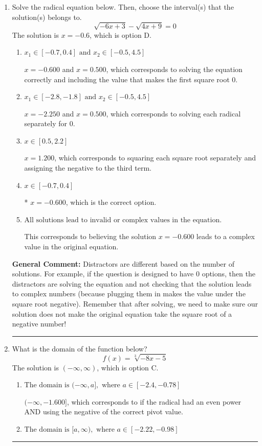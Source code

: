 \documentclass{extbook}[14pt]
\newcommand{\litem}[1]{\item #1

\rule{\textwidth}{0.4pt}}
\begin{document}
\begin{enumerate}\litem{
Solve the radical equation below. Then, choose the interval(s) that the solution(s) belongs to.
\[ \sqrt{-6 x + 3} - \sqrt{4 x + 9} = 0 \]The solution is \( x = -0.6 \), which is option D.\begin{enumerate}[label=\Alph*.]
\item \( x_1 \in [-0.7, 0.4] \text{ and } x_2 \in [-0.5,4.5] \)

$x = -0.600$ and $x = 0.500$, which corresponds to solving the equation correctly and including the value that makes the first square root 0.
\item \( x_1 \in [-2.8, -1.8] \text{ and } x_2 \in [-0.5,4.5] \)

$x = -2.250$ and $x = 0.500$, which corresponds to solving each radical separately for 0.
\item \( x \in [0.5,2.2] \)

$x = 1.200$, which corresponds to squaring each square root separately and assigning the negative to the third term.
\item \( x \in [-0.7,0.4] \)

* $x = -0.600$, which is the correct option.
\item \( \text{All solutions lead to invalid or complex values in the equation.} \)

This corresponds to believing the solution $x = -0.600$ leads to a complex value in the original equation.
\end{enumerate}

\textbf{General Comment:} Distractors are different based on the number of solutions. For example, if the question is designed to have 0 options, then the distractors are solving the equation and not checking that the solution leads to complex numbers (because plugging them in makes the value under the square root negative). Remember that after solving, we need to make sure our solution does not make the original equation take the square root of a negative number!
}
\litem{
What is the domain of the function below?
\[ f(x) = \sqrt[3]{-8 x - 5} \]The solution is \( (-\infty, \infty) \), which is option C.\begin{enumerate}[label=\Alph*.]
\item \( \text{The domain is } (-\infty, a], \text{   where } a \in [-2.4, -0.78] \)

$(-\infty, -1.600]$, which corresponds to if the radical had an even power AND using the negative of the correct pivot value.
\item \( \text{The domain is } [a, \infty), \text{   where } a \in [-2.22, -0.98] \)


\end{enumerate}}
\end{enumerate}
\end{document}
